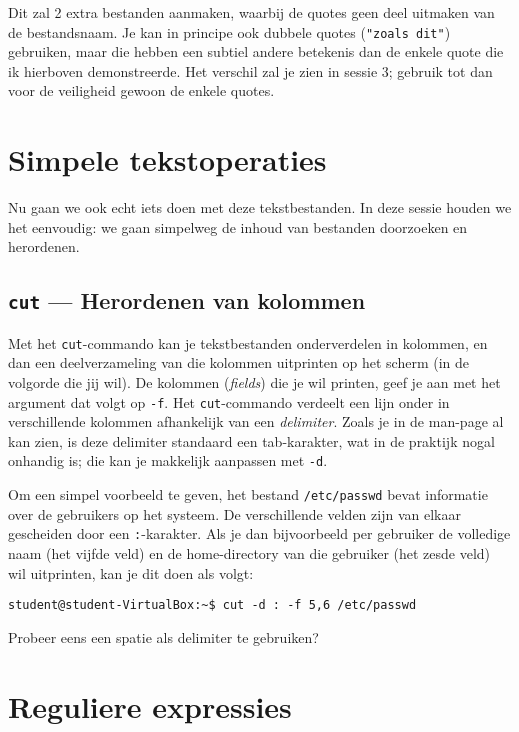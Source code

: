 \documentclass[a4paper,twoside,openany]{memoir}
\begin{document}
Dit zal 2 extra bestanden aanmaken, waarbij de quotes geen deel uitmaken van de
bestandsnaam. Je kan in principe ook dubbele quotes (\verb!"zoals dit"!)
gebruiken, maar die hebben een subtiel andere betekenis dan de enkele quote die
ik hierboven demonstreerde. Het verschil zal je zien in sessie 3; gebruik tot
dan voor de veiligheid gewoon de enkele quotes.

\chapter{Simpele tekstoperaties}

Nu gaan we ook echt iets doen met deze tekstbestanden. In deze sessie houden we
het eenvoudig: we gaan simpelweg de inhoud van bestanden doorzoeken en
herordenen.

\section{\texttt{cut} --- Herordenen van kolommen}

Met het \verb!cut!-commando kan je tekstbestanden onderverdelen in kolommen, en
dan een deelverzameling van die kolommen uitprinten op het scherm (in de
volgorde die jij wil). De kolommen (\emph{fields}) die je wil printen, geef je
aan met het argument dat volgt op \verb!-f!. Het \verb!cut!-commando verdeelt
een lijn onder in verschillende kolommen afhankelijk van een \emph{delimiter}.
Zoals je in de man-page al kan zien, is deze delimiter standaard een
tab-karakter, wat in de praktijk nogal onhandig is; die kan je makkelijk
aanpassen met \verb!-d!.

Om een simpel voorbeeld te geven, het bestand \verb!/etc/passwd! bevat
informatie over de gebruikers op het systeem. De verschillende velden zijn van
elkaar gescheiden door een \verb!:!-karakter. Als je dan bijvoorbeeld per
gebruiker de volledige naam (het vijfde veld) en de home-directory van die
gebruiker (het zesde veld) wil uitprinten, kan je dit doen als volgt:

\begin{verbatim}
student@student-VirtualBox:~$ cut -d : -f 5,6 /etc/passwd
\end{verbatim}

Probeer eens een spatie als delimiter te gebruiken?

\chapter{Reguliere expressies}
\end{document}
